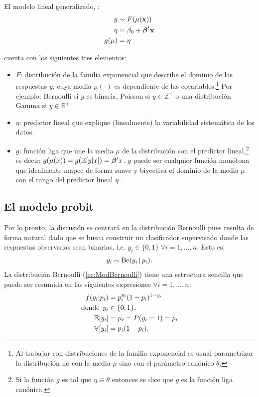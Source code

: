 \documentclass[../Main/Main.tex]{subfiles}
\begin{document}
\begin{definition} El modelo lineal generalizado, \citet{sundberg2016exponential}:
\begin{align} 
	y &\sim F(\mu(\mathbf{x})) \label{ec:GLM} \\ 
	\eta &= \beta_0 + \bm{\beta}^t\mathbf{x} \nonumber \\ 
	g(\mu) &= \eta \nonumber
\end{align}
\end{definition}
cuenta con los siguientes tres elementos:
\begin{itemize}[label={}]
	\item $F$: distribución de la familia exponencial que describe el dominio de las respuestas $y$, cuya media $\mu(\cdot)$ es dependiente de las covariables.\footnote{Al trabajar con distribuciones de la familia exponencial es usual parametrizar la distribución no con la media $\mu$ sino con el parámetro canónico $\theta$.} Por ejemplo: Bernoulli si $y$ es binaria, Poisson si $y \in \mathbb{Z}^+$ o una distribución Gamma si $y \in \mathbb{R}^+$
	\item $\eta$: predictor lineal que explique (linealmente) la variabilidad sistemática de los datos.%
	\item $g$: función liga que une la media $\mu$ de la distribución con el predictor lineal,\footnote{Si la función $g$ es tal que $\eta \equiv \theta$ entonces se dice que $g$ es la función liga canónica. } es decir: $g(\mu(x)) = g(\mathbb{E}[y|x]) = \bm{\beta}^tx$. $g$ puede ser cualquier función monótona que idealmente mapee de forma suave y biyectiva el dominio de la media $\mu$ con el rango del predictor lineal $\eta$ \autocite{hardle2004semiparametric}. 
\end{itemize}

\subsection{El modelo probit}
Por lo pronto, la discusión se centrará en la distribución Bernoulli pues resulta de forma natural dado que se busca construir un clasificador supervisado donde las respuestas observadas sean binarias, i.e. $y_i \in \{0,1\} \; \forall i=1,\ldots,n$. Esto es:
\begin{align}
	y_i \sim \text{Be}(y_i \, |\, p_i). \label{ec:ModBernoulli}
\end{align}
La distribución Bernoulli (\ref{ec:ModBernoulli}) tiene una estructura sencilla que puede ser resumida en las siguientes expresiones $\forall i = 1,\ldots,n$:  
\begin{align}
	f(y_i|p_i) &= p_i^{y_i}(1 - p_i)^{1 - y_i} \label{ec:DensidadBernoulli} \\
	\text{donde }\, y_i &\in \{0,1\},  \nonumber\\
	\mathbb{E}[y_i] &= \mu_i = P(y_i = 1) = p_i  \nonumber\\
	\mathbb{V}[y_i] &= p_i(1 - p_i) \nonumber. 
\end{align}			
\end{document}
